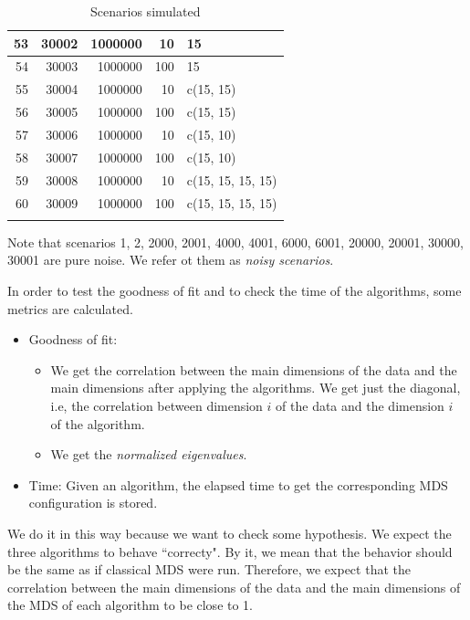 \documentclass[11pt]{report}
\begin{document}
\begin{longtable}{|r|r|r|r|l|}
\hline
53 & 30002 & 1000000 & 10 & 15 \\ 
\hline
54 & 30003 & 1000000 & 100 & 15 \\ 
\hline
55 & 30004 & 1000000 & 10 & c(15, 15) \\ 
\hline
56 & 30005 & 1000000 & 100 & c(15, 15) \\ 
\hline
57 & 30006 & 1000000 & 10 & c(15, 10) \\ 
\hline
58 & 30007 & 1000000 & 100 & c(15, 10) \\ 
\hline
59 & 30008 & 1000000 & 10 & c(15, 15, 15, 15) \\ 
\hline
60 & 30009 & 1000000 & 100 & c(15, 15, 15, 15) \\ 
\hline
\caption{Scenarios simulated} 
\label{scenearios_sim}
\end{longtable}

\indent Note that scenarios 1, 2, 2000, 2001, 4000, 4001, 6000, 6001, 20000,
20001, 30000, 30001 are pure noise. We refer ot them as \textit{noisy 
scenarios}.

\indent In order to test the goodness of fit and to check the time of the 
algorithms, some metrics are calculated.

\begin{itemize}
\item Goodness of fit:
\begin{itemize}


\item We get the correlation between the main dimensions of the data and the
main dimensions after applying the algorithms. We get just the diagonal, i.e,
the correlation between dimension $i$ of the data and the dimension $i$ of the
algorithm. 

\item We get the \textit{normalized eigenvalues}.
\end{itemize}

\item Time: Given an algorithm, the elapsed time to get the corresponding MDS
configuration is stored.

\end{itemize}

\indent We do it in this way because we want to check some hypothesis. We 
expect the three algorithms to behave ``correcty". By it, we mean that the
behavior should be the same as if classical MDS were run. Therefore, we 
expect that the correlation between the main dimensions of the data and the
main dimensions of the MDS of each algorithm to be close to 1.
\end{document}
